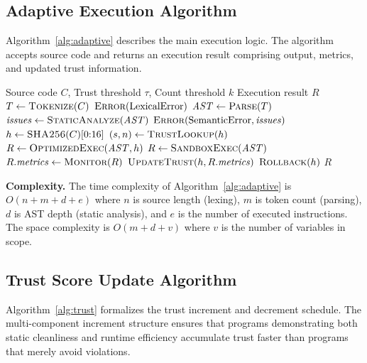 \documentclass[conference]{IEEEtran}
\begin{document}
\subsection{Adaptive Execution Algorithm}

Algorithm~\ref{alg:adaptive} describes the main execution logic.
The algorithm accepts source code and returns an execution result
comprising output, metrics, and updated trust information.

\begin{algorithm}[t]
\caption{Adaptive Execution.}
\label{alg:adaptive}
\begin{algorithmic}[1]
\Require Source code $C$, Trust threshold $\tau$, Count threshold $k$
\Ensure Execution result $R$
\State $T \gets \textsc{Tokenize}(C)$
  \State \Return $\textsc{Error}(\text{LexicalError})$
\EndIf
\State $\mathit{AST} \gets \textsc{Parse}(T)$
\State $\mathit{issues} \gets \textsc{StaticAnalyze}(\mathit{AST})$
  \State \Return $\textsc{Error}(\text{SemanticError}, \mathit{issues})$
\EndIf
\State $h \gets \textsc{SHA256}(C)[0{:}16]$
\State $(s, n) \gets \textsc{TrustLookup}(h)$
  \State $R \gets \textsc{OptimizedExec}(\mathit{AST}, h)$
\Else
  \State $R \gets \textsc{SandboxExec}(\mathit{AST})$
\EndIf
\State $R.\mathit{metrics} \gets \textsc{Monitor}(R)$
\State $\textsc{UpdateTrust}(h, R.\mathit{metrics})$
  \State $\textsc{Rollback}(h)$
\EndIf
\State \Return $R$
\end{algorithmic}
\end{algorithm}

\textbf{Complexity.} The time complexity of Algorithm~\ref{alg:adaptive}
is $O(n + m + d + e)$ where $n$ is source length (lexing), $m$ is
token count (parsing), $d$ is AST depth (static analysis), and $e$
is the number of executed instructions. The space complexity is
$O(m + d + v)$ where $v$ is the number of variables in scope.

\subsection{Trust Score Update Algorithm}

Algorithm~\ref{alg:trust} formalizes the trust increment and
decrement schedule. The multi-component increment structure
ensures that programs demonstrating both static cleanliness and
runtime efficiency accumulate trust faster than programs that
merely avoid violations.
\end{document}
